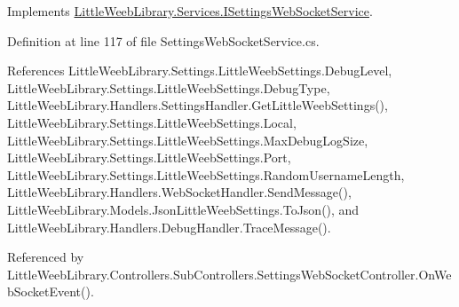 Implements \mbox{\hyperlink{interface_little_weeb_library_1_1_services_1_1_i_settings_web_socket_service_a4d6f03913f7445083d6b572438853bc0}{Little\+Weeb\+Library.\+Services.\+I\+Settings\+Web\+Socket\+Service}}.



Definition at line 117 of file Settings\+Web\+Socket\+Service.\+cs.



References Little\+Weeb\+Library.\+Settings.\+Little\+Weeb\+Settings.\+Debug\+Level, Little\+Weeb\+Library.\+Settings.\+Little\+Weeb\+Settings.\+Debug\+Type, Little\+Weeb\+Library.\+Handlers.\+Settings\+Handler.\+Get\+Little\+Weeb\+Settings(), Little\+Weeb\+Library.\+Settings.\+Little\+Weeb\+Settings.\+Local, Little\+Weeb\+Library.\+Settings.\+Little\+Weeb\+Settings.\+Max\+Debug\+Log\+Size, Little\+Weeb\+Library.\+Settings.\+Little\+Weeb\+Settings.\+Port, Little\+Weeb\+Library.\+Settings.\+Little\+Weeb\+Settings.\+Random\+Username\+Length, Little\+Weeb\+Library.\+Handlers.\+Web\+Socket\+Handler.\+Send\+Message(), Little\+Weeb\+Library.\+Models.\+Json\+Little\+Weeb\+Settings.\+To\+Json(), and Little\+Weeb\+Library.\+Handlers.\+Debug\+Handler.\+Trace\+Message().



Referenced by Little\+Weeb\+Library.\+Controllers.\+Sub\+Controllers.\+Settings\+Web\+Socket\+Controller.\+On\+Web\+Socket\+Event().


